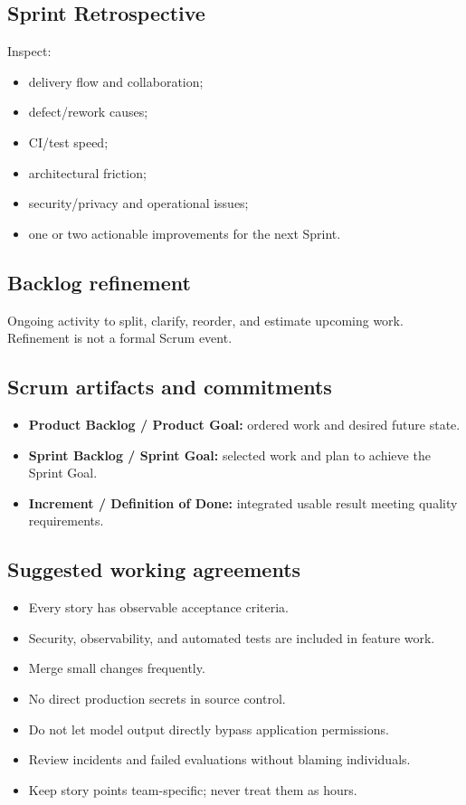 \subsection{Sprint Retrospective}

Inspect:

\begin{itemize}
\item delivery flow and collaboration;
\item defect/rework causes;
\item CI/test speed;
\item architectural friction;
\item security/privacy and operational issues;
\item one or two actionable improvements for the next Sprint.
\end{itemize}
\subsection{Backlog refinement}

Ongoing activity to split, clarify, reorder, and estimate upcoming work. Refinement is not a formal Scrum event.

\subsection{Scrum artifacts and commitments}

\begin{itemize}
\item \textbf{Product Backlog / Product Goal:} ordered work and desired future state.
\item \textbf{Sprint Backlog / Sprint Goal:} selected work and plan to achieve the Sprint Goal.
\item \textbf{Increment / Definition of Done:} integrated usable result meeting quality requirements.
\end{itemize}
\subsection{Suggested working agreements}

\begin{itemize}
\item Every story has observable acceptance criteria.
\item Security, observability, and automated tests are included in feature work.
\item Merge small changes frequently.
\item No direct production secrets in source control.
\item Do not let model output directly bypass application permissions.
\item Review incidents and failed evaluations without blaming individuals.
\item Keep story points team-specific; never treat them as hours.
\end{itemize}

